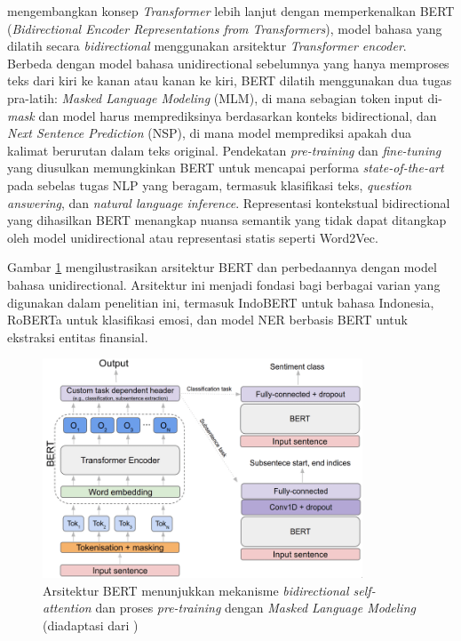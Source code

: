 \textcite{devlin2019} mengembangkan konsep \textit{Transformer} lebih lanjut dengan memperkenalkan BERT (\textit{Bidirectional Encoder Representations from Transformers}), model bahasa yang dilatih secara \textit{bidirectional} menggunakan arsitektur \textit{Transformer encoder}. Berbeda dengan model bahasa unidirectional sebelumnya yang hanya memproses teks dari kiri ke kanan atau kanan ke kiri, BERT dilatih menggunakan dua tugas pra-latih: \textit{Masked Language Modeling} (MLM), di mana sebagian token input di-\textit{mask} dan model harus memprediksinya berdasarkan konteks bidirectional, dan \textit{Next Sentence Prediction} (NSP), di mana model memprediksi apakah dua kalimat berurutan dalam teks original. Pendekatan \textit{pre-training} dan \textit{fine-tuning} yang diusulkan memungkinkan BERT untuk mencapai performa \textit{state-of-the-art} pada sebelas tugas NLP yang beragam, termasuk klasifikasi teks, \textit{question answering}, dan \textit{natural language inference}. Representasi kontekstual bidirectional yang dihasilkan BERT menangkap nuansa semantik yang tidak dapat ditangkap oleh model unidirectional atau representasi statis seperti Word2Vec.

Gambar \ref{fig:bert-architecture} mengilustrasikan arsitektur BERT dan perbedaannya dengan model bahasa unidirectional. Arsitektur ini menjadi fondasi bagi berbagai varian yang digunakan dalam penelitian ini, termasuk IndoBERT untuk bahasa Indonesia, RoBERTa untuk klasifikasi emosi, dan model NER berbasis BERT untuk ekstraksi entitas finansial.

\begin{figure}[H]
  \centering
  \includegraphics[width=0.85\textwidth]{image/bert-architecture-diagram.png}
  \caption{Arsitektur BERT menunjukkan mekanisme \textit{bidirectional self-attention} dan proses \textit{pre-training} dengan \textit{Masked Language Modeling} (diadaptasi dari \textcite{devlin2019})}
  \label{fig:bert-architecture}
\end{figure}

